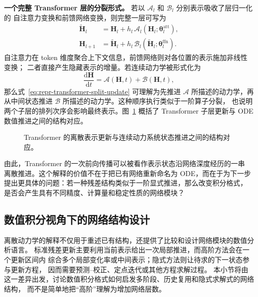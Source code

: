 \documentclass[UTF8,a4paper,zihao=-4,oneside,openany]{ctexbook}
\makeatletter
\newcommand{\AMLFigure}[2][0.96\linewidth]{%
  \begingroup
  \let\AtBeginDocument\@gobble
  \endgroup
}
\makeatother
\begin{document}
\textbf{一个完整 Transformer 层的分裂形式。}
若以 \(\mathcal{A}_l\) 和 \(\mathcal{B}_l\) 分别表示吸收了层归一化的
自注意力变换和前馈网络变换，则完整一层可写为
\begin{align}
    \widetilde{\boldsymbol{H}}_l
    &=
    \boldsymbol{H}_l
    +
    h_l\,
    \mathcal{A}_l(
        \boldsymbol{H}_l;
        \boldsymbol{\theta}^{\mathrm{att}}_l
    ),
    \nonumber\\
    \boldsymbol{H}_{l+1}
    &=
    \widetilde{\boldsymbol{H}}_l
    +
    h_l\,
    \mathcal{B}_l(
        \widetilde{\boldsymbol{H}}_l;
        \boldsymbol{\theta}^{\mathrm{ffn}}_l
    ).
    \label{eq:repr-transformer-split-update}
\end{align}
自注意力在 token 维度聚合上下文信息，前馈网络则对各位置的表示施加非线性变换；
二者直接产生隐藏表示的增量。若连续动力学被形式化为
\[
    \frac{\mathrm{d}\boldsymbol{H}}{\mathrm{d}t}
    =
    \mathcal{A}(\boldsymbol{H},t)
    +
    \mathcal{B}(\boldsymbol{H},t),
\]
那么式~\eqref{eq:repr-transformer-split-update} 可理解为先推进
\(\mathcal{A}\) 所描述的动力学，再从中间状态推进
\(\mathcal{B}\) 所描述的动力学。这种顺序执行类似于一阶算子分裂，
也说明两个子层的排列次序会影响最终表示。图~\ref{fig:transformer-sublayer-as-ode-solver}
概括了 Transformer 子层更新与 ODE 数值推进之间的结构对应。

\begin{figure}[htbp]
    \centering
    \AMLFigure{figure-transformer-sublayer-as-ode-solver}
    \caption{Transformer 的离散表示更新与连续动力系统状态推进之间的结构对应。}
    \label{fig:transformer-sublayer-as-ode-solver}
\end{figure}

由此，Transformer 的一次前向传播可以被看作表示状态沿网络深度经历的一串
离散推进。这个解释的价值不在于把已有网络重新命名为 ODE，而在于为下一步
提出更具体的问题：若一种残差结构类似于一阶显式推进，那么改变积分格式，
是否会产生具有不同精度、计算量和稳定性质的网络模块？

\subsection{数值积分视角下的网络结构设计}

离散动力学的解释不仅用于重述已有结构，还提供了比较和设计网络模块的数值分析语言。
标准残差更新主要利用当前表示给出一次局部推进，而高阶方法会在一个更新区间内
综合多个局部变化率或中间表示；隐式方法则让待求的下一状态参与更新方程，
因而需要预测--校正、定点迭代或其他方程求解过程。
本小节将由这一差异出发，讨论数值积分格式如何启发多阶段、历史复用和隐式求解式的网络结构，
而不是简单地把“高阶”理解为增加网络层数。
\end{document}
